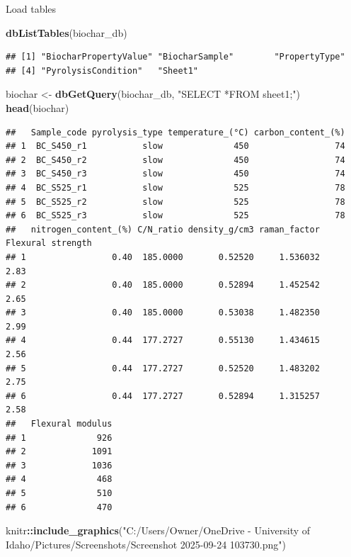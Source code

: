 \documentclass[
]{article}
\newenvironment{Shaded}{\begin{snugshade}}{\end{snugshade}}
\newcommand{\FunctionTok}[1]{\textcolor[rgb]{0.13,0.29,0.53}{\textbf{#1}}}
\newcommand{\NormalTok}[1]{#1}
\newcommand{\OtherTok}[1]{\textcolor[rgb]{0.56,0.35,0.01}{#1}}
\newcommand{\SpecialCharTok}[1]{\textcolor[rgb]{0.81,0.36,0.00}{\textbf{#1}}}
\newcommand{\StringTok}[1]{\textcolor[rgb]{0.31,0.60,0.02}{#1}}
\begin{document}
Load tables

\begin{Shaded}
\begin{Highlighting}[]
\FunctionTok{dbListTables}\NormalTok{(biochar\_db)}
\end{Highlighting}
\end{Shaded}

\begin{verbatim}
## [1] "BiocharPropertyValue" "BiocharSample"        "PropertyType"        
## [4] "PyrolysisCondition"   "Sheet1"
\end{verbatim}

\begin{Shaded}
\begin{Highlighting}[]
\NormalTok{biochar }\OtherTok{\textless{}{-}} \FunctionTok{dbGetQuery}\NormalTok{(biochar\_db, }\StringTok{"SELECT *FROM sheet1;"}\NormalTok{)}
\FunctionTok{head}\NormalTok{(biochar)}
\end{Highlighting}
\end{Shaded}

\begin{verbatim}
##   Sample_code pyrolysis_type temperature_(°C) carbon_content_(%)
## 1  BC_S450_r1           slow              450                 74
## 2  BC_S450_r2           slow              450                 74
## 3  BC_S450_r3           slow              450                 74
## 4  BC_S525_r1           slow              525                 78
## 5  BC_S525_r2           slow              525                 78
## 6  BC_S525_r3           slow              525                 78
##   nitrogen_content_(%) C/N_ratio density_g/cm3 raman_factor Flexural strength
## 1                 0.40  185.0000       0.52520     1.536032              2.83
## 2                 0.40  185.0000       0.52894     1.452542              2.65
## 3                 0.40  185.0000       0.53038     1.482350              2.99
## 4                 0.44  177.2727       0.55130     1.434615              2.56
## 5                 0.44  177.2727       0.52520     1.483202              2.75
## 6                 0.44  177.2727       0.52894     1.315257              2.58
##   Flexural modulus
## 1              926
## 2             1091
## 3             1036
## 4              468
## 5              510
## 6              470
\end{verbatim}

\begin{Shaded}
\begin{Highlighting}[]
\NormalTok{knitr}\SpecialCharTok{::}\FunctionTok{include\_graphics}\NormalTok{(}\StringTok{"C:/Users/Owner/OneDrive {-} University of Idaho/Pictures/Screenshots/Screenshot 2025{-}09{-}24 103730.png"}\NormalTok{)}
\end{Highlighting}
\end{Shaded}
\end{document}
